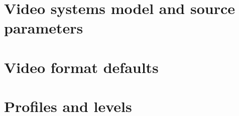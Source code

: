 \clearpage
\section{Video systems model and source parameters}


\clearpage
\section{Video format defaults}

\clearpage
\section{Profiles and levels}

